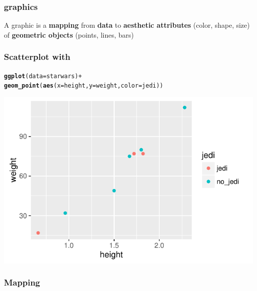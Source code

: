 \documentclass[12pt]{beamer}\usepackage[]{graphicx}\usepackage[]{color}
\makeatletter
\newcommand{\hlopt}[1]{\textcolor[rgb]{0,0,0}{#1}}%
\newcommand{\hlstd}[1]{\textcolor[rgb]{0.345,0.345,0.345}{#1}}%
\newcommand{\hlkwc}[1]{\textcolor[rgb]{0.333,0.667,0.333}{#1}}%
\newcommand{\hlkwd}[1]{\textcolor[rgb]{0.737,0.353,0.396}{\textbf{#1}}}%
\newenvironment{kframe}{%
 \def\at@end@of@kframe{}%
 \ifinner\ifhmode%
  \def\at@end@of@kframe{\end{minipage}}%
  \begin{minipage}{\columnwidth}%
 \fi\fi%
 \def\FrameCommand##1{\hskip\@totalleftmargin \hskip-\fboxsep
 \colorbox{shadecolor}{##1}\hskip-\fboxsep
     \hskip-\linewidth \hskip-\@totalleftmargin \hskip\columnwidth}%
 \MakeFramed {\advance\hsize-\width
   \@totalleftmargin\z@ \linewidth\hsize
   \@setminipage}}%
 {\par\unskip\endMakeFramed%
 \at@end@of@kframe}
\newenvironment{knitrout}{}{} %
\makeatother
\begin{document}

\begin{frame}
\frametitle{ graphics}

A graphic is a {\hilit \textbf{mapping}} from \textbf{data} to \textbf{aesthetic attributes} (color, shape, size) of \textbf{geometric objects} (points, lines, bars)
\eb

\end{frame}


\begin{frame}[fragile]
\frametitle{Scatterplot with }
\begin{knitrout}\scriptsize
{}\color{fgcolor}\begin{kframe}
\begin{alltt}
\hlkwd{ggplot}\hlstd{(}\hlkwc{data} \hlstd{= starwars)} \hlopt{+}
  \hlkwd{geom_point}\hlstd{(}\hlkwd{aes}\hlstd{(}\hlkwc{x} \hlstd{= height,} \hlkwc{y} \hlstd{= weight,} \hlkwc{color} \hlstd{= jedi))}
\end{alltt}
\end{kframe}

{\centering \includegraphics[width=.8\linewidth,height=.5\linewidth]{figure/sw_scatterplot-1} 

}



\end{knitrout}
\end{frame}


\begin{frame}
\frametitle{Mapping}
\begin{center}
\end{center}
\end{frame}
\end{document}
